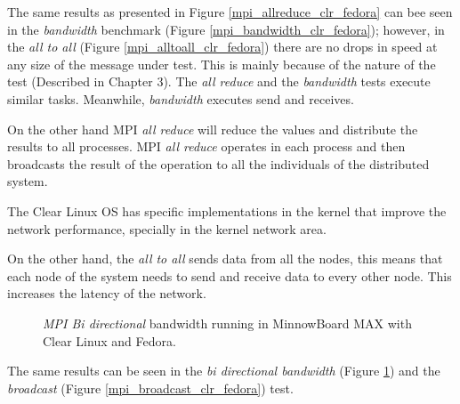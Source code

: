 The same results as presented in Figure \ref{mpi_allreduce_clr_fedora} can bee
seen in the \textit{bandwidth} benchmark (Figure
\ref{mpi_bandwidth_clr_fedora}); however, in the \textit{all to all} (Figure
\ref{mpi_alltoall_clr_fedora}) there are no drops in speed at any size of the
message under test.  This is mainly because of the nature of the test
(Described in Chapter 3). The \textit{all reduce} and the \textit{bandwidth}
tests execute similar tasks. Meanwhile, \textit{bandwidth} executes send and
receives.

On the other hand MPI \textit{all reduce} will reduce the values and distribute
the results to all processes. MPI \textit{all reduce} operates in each process
and then broadcasts the result of the operation to all the individuals of the
distributed system.

The Clear Linux OS has specific implementations in the kernel that improve the
network performance, specially in the kernel network area.

On the other hand, the \textit{all to all} sends data from all the nodes, this
means that each node of the system needs to send and receive data to every
other node. This increases the latency of the network.

\begin{figure}[H]
\begin{center}
\end{center}
\caption{\textit{MPI Bi directional} bandwidth running in  MinnowBoard MAX with Clear Linux
and Fedora.}
\label{mpi_bibw_clr_fedora}
\end{figure}


The same results can be seen in the \textit{bi directional bandwidth} (Figure
\ref{mpi_bibw_clr_fedora}) and the \textit{broadcast} (Figure
\ref{mpi_broadcast_clr_fedora}) test. 

